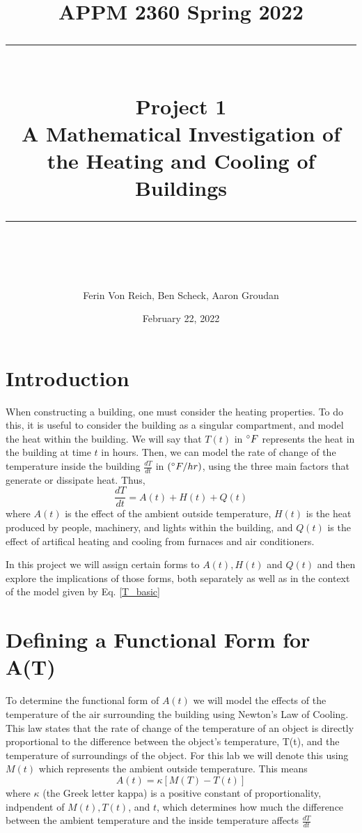 \documentclass[titlepage]{article}
\title{
\large APPM 2360 Spring 2022 \\
[10pt] 
\rule{\linewidth}{2pt}  \\[10pt]
\huge Project 1 \\
\LARGE A Mathematical Investigation of the Heating and Cooling of Buildings\\
\rule{\linewidth}{2pt}  \\[10pt]
\author{Ferin Von Reich, Ben Scheck, Aaron Groudan}
\date{February 22, 2022}
}
\begin{document}
\maketitle

\tableofcontents
\newpage

\section{Introduction}
When constructing a building, one must consider the heating properties. To do this, 
it is useful to consider the building as a singular compartment, and model the heat within the building. 
We will say that $T(t)$ in $\degree F$ represents the heat in the building at time $t$ in hours. 
Then, we can model the rate of change of the temperature inside the building $\frac{dT}{dt}$ in $(\degree F/hr)$, 
using the three main factors that generate or dissipate heat. Thus,
\begin{equation}\label{T_basic}
\frac{dT}{dt} = A(t) + H(t) + Q(t) 
\end{equation}
where $A(t)$ is the effect of the ambient outside temperature, $H(t)$ is the heat produced by people, machinery, 
and lights within the building, and $Q(t)$ is the effect of artifical heating and cooling from
furnaces and air conditioners.

In this project we will assign certain forms to $A(t), H(t)$ and $Q(t)$  and then explore
the implications of those forms, both separately as well as in the context of the model 
given by Eq. \eqref{T_basic}


\section{Defining a Functional Form for A(T)}
To determine the functional form of $A(t)$ we will model the effects of the temperature of the air surrounding the 
building using Newton's Law of Cooling. This law states that the rate of change of the temperature of an object 
is directly proportional to the difference between the object's temperature, T(t), 
and the temperature of surroundings of the object. For this lab we will denote this using $M(t)$ which represents 
the ambient outside temperature. This means
\begin{equation}\label{A(t)}
    A(t) = \kappa[M(T)-T(t)]
\end{equation}
where $\kappa$ (the Greek letter kappa) is a positive constant of proportionality, indpendent of $M(t), T(t)$, and $t$, which determines how much the 
difference between the ambient temperature and the inside temperature affects $\frac{dT}{dt}$
\end{document}
